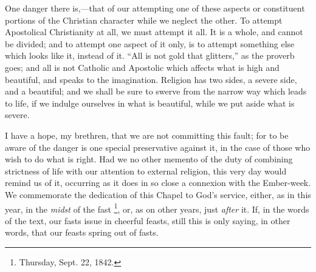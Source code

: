 One danger there is,—that of our attempting one of these aspects
or constituent portions of the Christian character while we neglect
the other. To attempt Apostolical Christianity at all, we must attempt
it all. It is a whole, and cannot be divided; and to attempt one
aspect of it only, is to attempt something else which looks like it,
instead of it. ``All is not gold that glitters,'' as the
proverb goes; and all is not Catholic and Apostolic which affects what
is high and beautiful, and speaks to the imagination. Religion has two
sides, a severe side, and a beautiful; and we shall be sure to swerve
from the narrow way which leads to life, if we indulge ourselves in
what is beautiful, while we put aside what is severe.

I have a hope, my brethren, that we are not committing this fault;
for to be aware of the danger is one special preservative against it,
in the case of those who wish to do what is right. Had we no other
memento of the duty of combining strictness of life with our attention
to external religion, this very day would remind us of it, occurring
as it does in so close a connexion with the Ember-week. We commemorate
the dedication of this Chapel to God's service, either, as in this
year, in the \emph{midst} of the fast \footnote{Thursday, Sept. 22, 1842.}, or, as on other years, just \emph{after} it. If, in the words
of the text, our fasts issue in cheerful feasts, still this is only
saying, in other words, that our feasts spring out of fasts.

